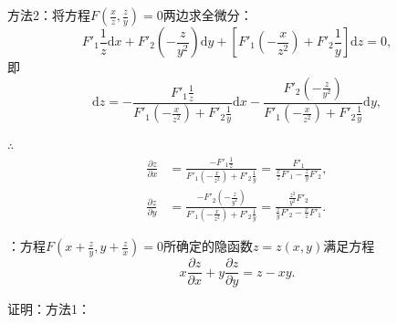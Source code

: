 \documentclass[12pt,UTF8]{ctexart}
\begin{document}
\begin{enumerate}
方法2：将方程$F(\frac xz,\frac zy)=0$两边求全微分：
\[
F'_1\frac1z\mathrm dx+F'_2(-\frac z{y^2})\mathrm dy+[F'_1(-\frac x{z^2})+F'_2\frac1y]\mathrm dz=0,
\]
即
\[
\mathrm dz=-\frac{F'_1\frac1z}{F'_1(-\frac x{z^2})+F'_2\frac1y}\mathrm dx-\frac{F'_2(-\frac z{y^2})}{F'_1(-\frac x{z^2})+F'_2\frac1y}\mathrm dy,
\]

$\therefore$
\[\begin{split}
\frac{\partial z}{\partial x}&=\frac{-F'_1\frac1z}{F'_1(-\frac x{z^2})+F'_2\frac1y}=\frac{F'_1}{\frac xzF'_1-\frac zyF'_2},\\
\frac{\partial z}{\partial y}&=\frac{-F'_2(-\frac z{y^2})}{F'_1(-\frac x{z^2})+F'_2\frac1y}=\frac{\frac{z^2}{y^2}F'_2}{\frac zyF'_2-\frac xzF'_1}.
\end{split}\]

：方程$F(x+\frac zy,y+\frac zx)=0$所确定的隐函数$z=z(x,y)$满足方程
\[
x\frac{\partial z}{\partial x}+y\frac{\partial z}{\partial y}=z-xy.
\]

证明：方法1：


\end{enumerate}
\end{document}
